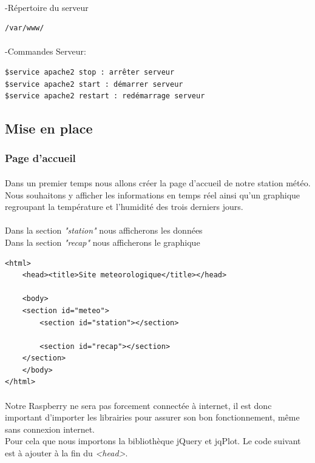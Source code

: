 \documentclass[a4paper, titlepage, oneside, 12pt]{article}%
\begin{document}
\paragraph{}
-Répertoire du serveur
\begin{lstlisting}
/var/www/
\end{lstlisting}
\paragraph{}
-Commandes Serveur:
\begin{lstlisting}
$service apache2 stop : arrêter serveur
$service apache2 start : démarrer serveur
$service apache2 restart : redémarrage serveur
\end{lstlisting}

\subsection{Mise en place}
\subsubsection{Page d'accueil}
\paragraph{}
Dans un premier temps nous allons créer la page d’accueil de notre station météo.
Nous souhaitons y afficher les informations en temps réel ainsi qu'un graphique regroupant la température et l'humidité des trois derniers jours.\\ \\ 
Dans la section \textit{"station"} nous afficherons les données\\
Dans la section \textit{"recap"} nous afficherons le graphique\\


\begin{lstlisting}
<html>
	<head><title>Site meteorologique</title></head>

	<body>
	<section id="meteo">		
		<section id="station"></section>
				
		<section id="recap"></section>
	</section>
	</body>
</html>
\end{lstlisting}

\paragraph{}
Notre Raspberry ne sera pas forcement connectée à internet, il est donc important d'importer les librairies pour assurer son bon fonctionnement, même sans connexion internet.\\
Pour cela que nous importons la bibliothèque jQuery et jqPlot. Le code suivant est à ajouter à la fin du \textit{<head>}.
\end{document}
